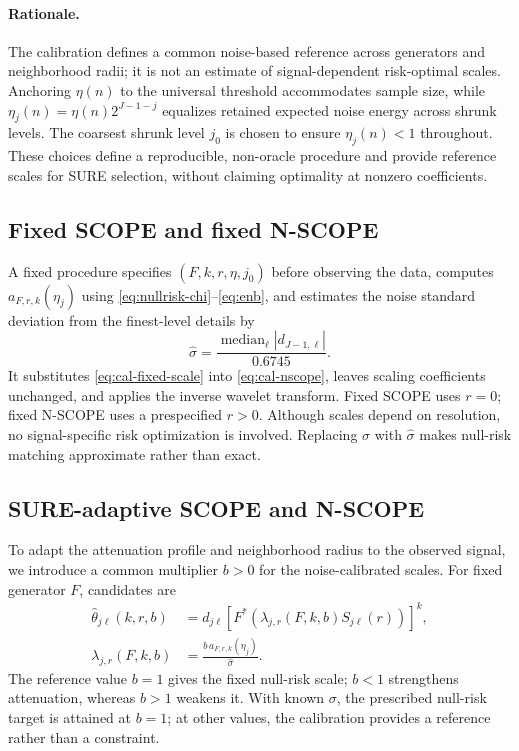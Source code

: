 \documentclass[12pt]{article}
\theoremstyle{definition}
\theoremstyle{definition}
\DeclareMathOperator{\median}{median}
\begin{document}
\paragraph{Rationale.}
The calibration defines a common noise-based reference across
generators and neighborhood radii; it is not an estimate of
signal-dependent risk-optimal scales. Anchoring $\eta(n)$ to the
universal threshold accommodates sample size, while
$\eta_j(n)=\eta(n)2^{J-1-j}$ equalizes retained expected noise
energy across shrunk levels. The coarsest shrunk level $j_0$ is
chosen to ensure $\eta_j(n)<1$ throughout. These choices define
a reproducible, non-oracle procedure and provide reference scales
for SURE selection, without claiming optimality at nonzero
coefficients.

\subsection{Fixed SCOPE and fixed N-SCOPE}
\label{sec:procedure}

A fixed procedure specifies $(F,k,r,\eta,j_0)$ before observing the
data, computes $a_{F,r,k}(\eta_j)$ using
\eqref{eq:nullrisk-chi}--\eqref{eq:enb}, and estimates the noise
standard deviation from the finest-level details by
\begin{equation}
\widehat\sigma=\frac{\median_{\ell}|d_{J-1,\ell}|}{0.6745}.
\label{eq:cal-sigmahat}
\end{equation}
It substitutes \eqref{eq:cal-fixed-scale} into
\eqref{eq:cal-nscope}, leaves scaling coefficients unchanged, and
applies the inverse wavelet transform. Fixed SCOPE uses $r=0$;
fixed N-SCOPE uses a prespecified $r>0$. Although scales depend
on resolution, no signal-specific risk optimization is involved.
Replacing $\sigma$ with $\widehat\sigma$ makes null-risk
matching approximate rather than exact.

\subsection{SURE-adaptive SCOPE and N-SCOPE}
\label{sec:sure-calibration}

To adapt the attenuation profile and neighborhood radius to the
observed signal, we introduce a common multiplier $b>0$ for the
noise-calibrated scales. For fixed generator $F$, candidates are
\begin{align}
\widehat\theta_{j\ell}(k,r,b)
 &= d_{j\ell}\left[F^*\!\left(
  \lambda_{j,r}(F,k,b)S_{j\ell}(r)\right)\right]^k,\nonumber\\
\lambda_{j,r}(F,k,b)
 &= \frac{b\,a_{F,r,k}(\eta_j)}{\widehat\sigma}.
\label{eq:simul-sure-scale}
\end{align}
The reference value $b=1$ gives the fixed null-risk scale;
$b<1$ strengthens attenuation, whereas $b>1$ weakens it.
With known $\sigma$, the prescribed null-risk target is attained
at $b=1$; at other values, the calibration provides a reference
rather than a constraint.
\end{document}
